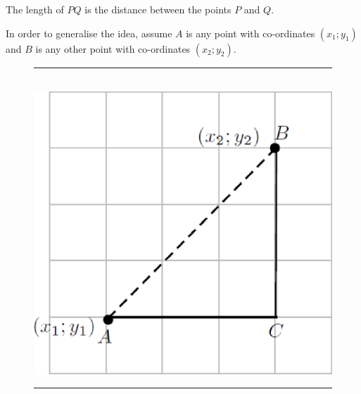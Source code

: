         \label{m39107*id67090}The length of $PQ$ is the distance between the points $P$ and $Q$.\par 
        \label{m39107*id67126}In order to generalise the idea, assume $A$ is any point with co-ordinates $\left({x}_{1};{y}_{1}\right)$ and $B$ is any other point with co-ordinates $\left({x}_{2};{y}_{2}\right)$.\par 
    \setcounter{subfigure}{0}
	\begin{figure}[H] %
    \begin{center}
    \rule[.1in]{\figurerulewidth}{.005in} \\
        \label{m39107*uid39!!!underscore!!!media}\label{m39107*uid39!!!underscore!!!printimage}\includegraphics[width=0.5\columnwidth]{col11306.imgs/m39107_MG10C14_016.png} %
      \vspace{2pt}
    \vspace{.1in}
    \rule[.1in]{\figurerulewidth}{.005in} \\
    \end{center}
 \end{figure}       
